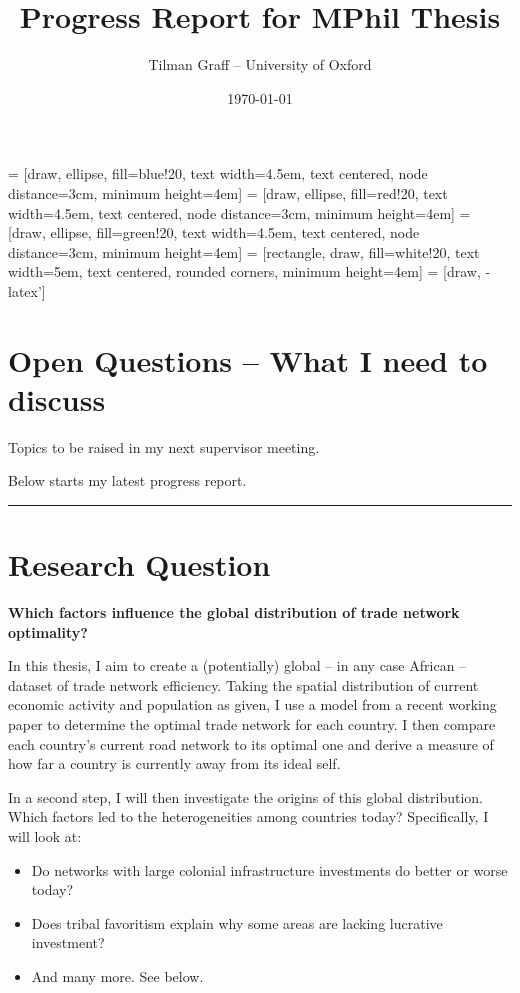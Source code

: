 \documentclass[11pt, oneside]{article}   	%
\title{Progress Report for MPhil Thesis}
\author{Tilman Graff -- University of Oxford}
\date{\today}
\begin{document}
 = [draw, ellipse, fill=blue!20,
    text width=4.5em, text centered, node distance=3cm, minimum height=4em]
 = [draw, ellipse, fill=red!20,
    text width=4.5em, text centered, node distance=3cm, minimum height=4em]
 = [draw, ellipse, fill=green!20,
    text width=4.5em, text centered, node distance=3cm, minimum height=4em]
 = [rectangle, draw, fill=white!20,
    text width=5em, text centered, rounded corners, minimum height=4em]
 = [draw, -latex']


\maketitle

\section*{Open Questions -- What I need to discuss}
Topics to be raised in my next supervisor meeting.

Below starts my latest progress report.

\noindent\rule{\textwidth}{0.4pt}

\section{Research Question}
\textbf{Which factors influence the global distribution of trade network optimality?}

In this thesis, I aim to create a (potentially) global -- in any case African -- dataset of trade network efficiency. Taking the spatial distribution of current economic activity and population as given, I use a model from a recent working paper to determine the optimal trade network for each country. I then compare each country's current road network to its optimal one and derive a measure of how far a country is currently away from its ideal self.

In a second step, I will then investigate the origins of this global distribution. Which factors led to the heterogeneities among countries today? Specifically, I will look at:

\begin{itemize}
  \item Do networks with large colonial infrastructure investments do better or worse today?
  \item Does tribal favoritism explain why some areas are lacking lucrative investment?
  \item And many more. See below.
\end{itemize}
\end{document}
